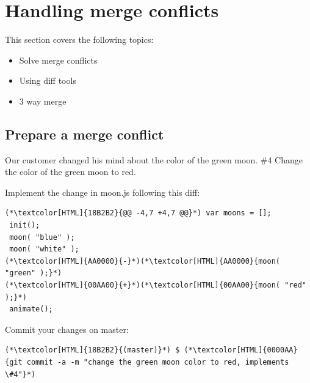 \section{Handling merge conflicts}
\begin{frame}[fragile]
  \slidetitle
  This section covers the following topics:
  \begin{itemize}
    \pause
    \item Solve merge conflicts
    \pause
    \item Using diff tools
    \pause
    \item 3 way merge
  \end{itemize}
\end{frame}

\subsection{Prepare a merge conflict}
\begin{frame}[fragile]
  \subslidetitle
  Our customer changed his mind about the color of the green moon.
  \newline \vspace{1em}
  \#4 Change the color of the green moon to red.

  Implement the change in moon.js following this diff:
  \begin{lstlisting}
(*\textcolor[HTML]{18B2B2}{@@ -4,7 +4,7 @@}*) var moons = [];
 init();
 moon( "blue" );
 moon( "white" );
(*\textcolor[HTML]{AA0000}{-}*)(*\textcolor[HTML]{AA0000}{moon( "green" );}*)
(*\textcolor[HTML]{00AA00}{+}*)(*\textcolor[HTML]{00AA00}{moon( "red" );}*)
 animate();
\end{lstlisting}

  Commit your changes on master:
  \begin{lstlisting}
(*\textcolor[HTML]{18B2B2}{(master)}*) $ (*\textcolor[HTML]{0000AA}{git commit -a -m "change the green moon color to red, implements \#4"}*)
\end{lstlisting}

\end{frame}

